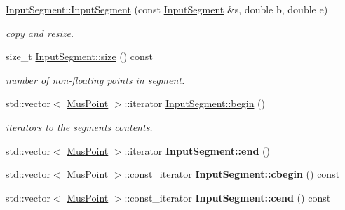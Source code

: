 \begin{DoxyCompactItemize}
\item 
\mbox{\hyperlink{group__segment_ga58d6af0b8186068f4bc26f58e6e62eef}{Input\+Segment\+::\+Input\+Segment}} (const \mbox{\hyperlink{classInputSegment}{Input\+Segment}} \&s, double b, double e)
\begin{DoxyCompactList}\small\item\em copy and resize. \end{DoxyCompactList}\item 
\mbox{\label{group__segment_ga05fee2bd8565c3076a6d800e37d7ab63}} 
size\+\_\+t \mbox{\hyperlink{group__segment_ga05fee2bd8565c3076a6d800e37d7ab63}{Input\+Segment\+::size}} () const
\begin{DoxyCompactList}\small\item\em number of non-\/floating points in segment. \end{DoxyCompactList}\item 
\mbox{\label{group__segment_gaccf3b9127fc3d068a95af19f46d9052d}} 
std\+::vector$<$ \mbox{\hyperlink{classMusPoint}{Mus\+Point}} $>$\+::iterator \mbox{\hyperlink{group__segment_gaccf3b9127fc3d068a95af19f46d9052d}{Input\+Segment\+::begin}} ()
\begin{DoxyCompactList}\small\item\em iterators to the segment\textquotesingle{}s contents. \end{DoxyCompactList}\item 
\mbox{\label{group__segment_ga1cc736fda27974f59c2e2dfc44eedf9e}} 
std\+::vector$<$ \mbox{\hyperlink{classMusPoint}{Mus\+Point}} $>$\+::iterator {\bfseries Input\+Segment\+::end} ()
\item 
\mbox{\label{group__segment_gaff8f8c77de90a74f028f2e7a6ea32f90}} 
std\+::vector$<$ \mbox{\hyperlink{classMusPoint}{Mus\+Point}} $>$\+::const\+\_\+iterator {\bfseries Input\+Segment\+::cbegin} () const
\item 
\mbox{\label{group__segment_ga9eae7fefbf0884764ff6a75fc5fa063b}} 
std\+::vector$<$ \mbox{\hyperlink{classMusPoint}{Mus\+Point}} $>$\+::const\+\_\+iterator {\bfseries Input\+Segment\+::cend} () const
\item 
\mbox{\label{group__segment_ga82a64bae54200b634bc42ac06dc7a916}} 

\end{DoxyCompactItemize}
